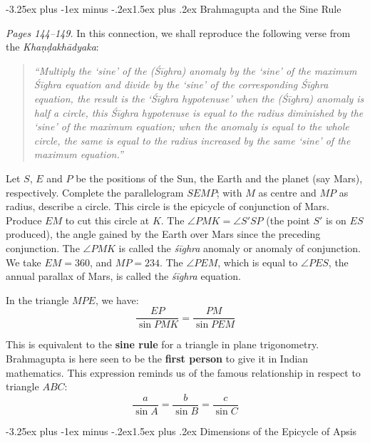 \documentclass[11pt,a4paper]{article}
\makeatletter
\renewcommand{\subsection}{\@startsection{subsection}{2}{\z@}%
  {-3.25ex plus -1ex minus -.2ex}{1.5ex plus .2ex}%
  {\normalfont\large\bfseries\color{sectioncolor}}}
\newcommand{\cnote}[1]{\textcolor{notecolor}{\textit{#1}}}
\makeatother
\begin{document}
\subsection{Brahmagupta and the Sine Rule}

\cnote{Pages 144--149.} In this connection, we shall reproduce the following verse from the \textit{Khaṇḍakhādyaka}:

\begin{quote}
\textit{``Multiply the `sine' of the (Śīghra) anomaly by the `sine' of the maximum Śīghra equation and divide by the `sine' of the corresponding Śīghra equation, the result is the `Śīghra hypotenuse' when the (Śīghra) anomaly is half a circle, this Śīghra hypotenuse is equal to the radius diminished by the `sine' of the maximum equation; when the anomaly is equal to the whole circle, the same is equal to the radius increased by the same `sine' of the maximum equation.''}
\end{quote}

Let $S$, $E$ and $P$ be the positions of the Sun, the Earth and the planet (say Mars), respectively. Complete the parallelogram $SEMP$; with $M$ as centre and $MP$ as radius, describe a circle. This circle is the epicycle of conjunction of Mars. Produce $EM$ to cut this circle at $K$. The $\angle PMK = \angle S'SP$ (the point $S'$ is on $ES$ produced), the angle gained by the Earth over Mars since the preceding conjunction. The $\angle PMK$ is called the \textit{śīghra} anomaly or anomaly of conjunction. We take $EM = 360$, and $MP = 234$. The $\angle PEM$, which is equal to $\angle PES$, the annual parallax of Mars, is called the \textit{śīghra} equation.

In the triangle $MPE$, we have:
\[
\frac{EP}{\sin PMK} = \frac{PM}{\sin PEM}
\]

This is equivalent to the \textbf{sine rule} for a triangle in plane trigonometry. Brahmagupta is here seen to be the \textbf{first person} to give it in Indian mathematics. This expression reminds us of the famous relationship in respect to triangle $ABC$:
\[
\frac{a}{\sin A} = \frac{b}{\sin B} = \frac{c}{\sin C}
\]

\subsection{Dimensions of the Epicycle of Apsis}
\end{document}

